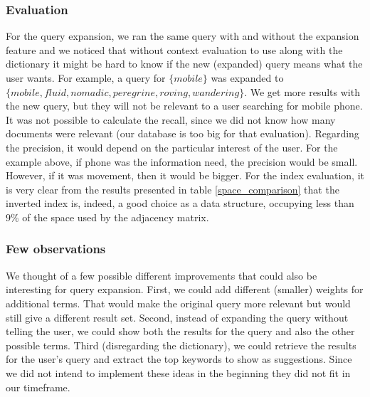 \subsubsection*{Evaluation}
For the query expansion, we ran the same query with and without the expansion feature and we noticed that without context evaluation to use along with the dictionary it might be hard to know if the new (expanded) query means what the user wants. For example, a query for $\{mobile\}$ was expanded to $\{mobile, fluid, nomadic, peregrine, roving, wandering\}$. We get more results with the new query, but they will not be relevant to a user searching for mobile phone. It was not possible to calculate the recall, since we did not know how many documents were relevant (our database is too big for that evaluation). Regarding the precision, it would depend on the particular interest of the user. For the example above, if phone was the information need, the precision would be small. However, if it was movement, then it would be bigger.
For the index evaluation, it is very clear from the results presented in table \ref{space_comparison} that the inverted index is, indeed, a good choice as a data structure, occupying less than $ 9\% $ of the space used by the adjacency matrix.

\subsubsection*{Few observations}
We thought of a few possible different improvements that could also be interesting for query expansion. First, we could add different (smaller) weights for additional terms. That would make the original query more relevant but would still give a different result set. Second, instead of expanding the query without telling the user, we could show both the results for the query and also the other possible terms. Third (disregarding the dictionary), we could retrieve the results for the user's query and extract the top keywords to show as suggestions. Since we did not intend to implement these ideas in the beginning they did not fit in our timeframe. 
